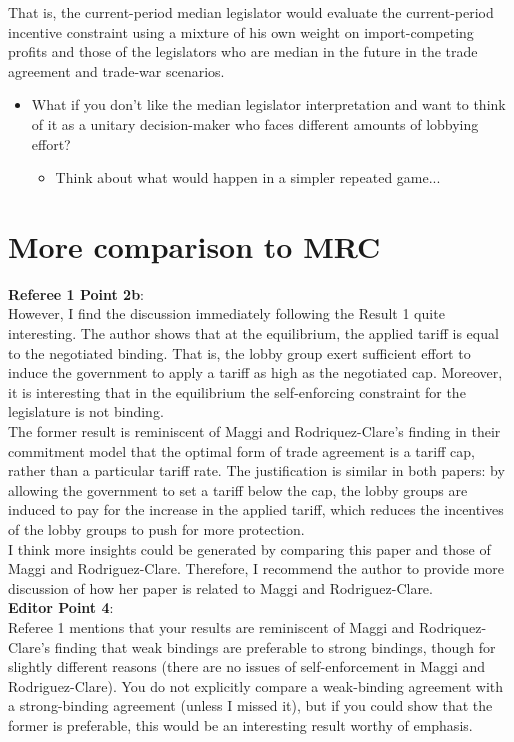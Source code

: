 \documentclass[12pt]{article}
\begin{document}
That is, the current-period median legislator would evaluate the current-period incentive constraint using a mixture of his own weight on import-competing profits and those of the legislators who are median in the future in the trade agreement and trade-war scenarios.
\begin{itemize}
	\item What if you don't like the median legislator interpretation and want to think of it as a unitary decision-maker who faces different amounts of lobbying effort?
		\begin{itemize}
			\item Think about what would happen in a simpler repeated game...
		\end{itemize}
\end{itemize}


\newpage
\section{More comparison to MRC}
\textbf{Referee 1 Point 2b}: \\
However, I find the discussion immediately following the Result 1 quite interesting. The author shows that at the equilibrium, the applied tariff is equal to the negotiated binding. That is, the lobby group exert sufficient effort to induce the government to apply a tariff as high as the negotiated cap. Moreover, it is interesting that in the equilibrium the self-enforcing constraint for the legislature is not binding. \\

The former result is reminiscent of Maggi and Rodriquez-Clare's finding in their commitment model that the optimal form of trade agreement is a tariff cap, rather than a particular tariff rate. The justification is similar in both papers: by allowing the government to set a tariff below the cap, the lobby groups are induced to pay for the increase in the applied tariff, which reduces the incentives of the lobby groups to push for more protection. \\

I think more insights could be generated by comparing this paper and those of Maggi and Rodriguez-Clare. Therefore, I recommend the author to provide more discussion of how her paper is related to Maggi and Rodriguez-Clare. \\

\textbf{Editor Point 4}:\\
Referee 1 mentions that your results are reminiscent of Maggi and Rodriquez-Clare's finding that weak bindings are preferable to strong bindings, though for slightly different reasons (there are no issues of self-enforcement in Maggi and Rodriguez-Clare). You do not explicitly compare a weak-binding agreement with a strong-binding agreement (unless I missed it), but if you could show that the former is preferable, this would be an interesting result worthy of emphasis.
\end{document}
